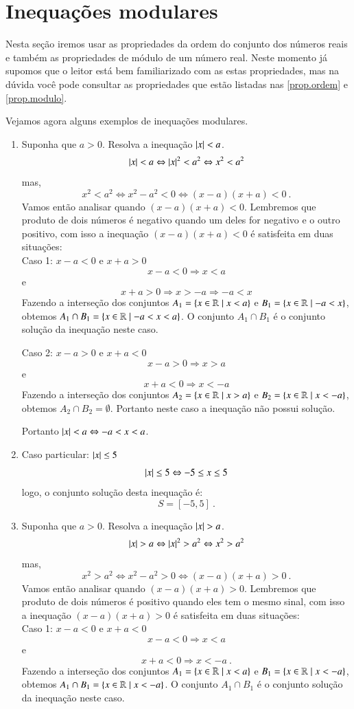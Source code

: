  \section{Inequações modulares}%

 Nesta seção iremos usar as propriedades da ordem do conjunto dos números reais e também as propriedades de módulo de um número real. Neste momento já supomos que o leitor está bem familiarizado com as estas propriedades, mas na dúvida você pode consultar as propriedades que estão listadas nas \autoref{prop.ordem} e \autoref{prop.modulo}.

 \begin{exem} Vejamos agora alguns exemplos de inequações modulares.
  \begin{enumerate}
   \item Suponha que $a> 0$. Resolva a inequação $\left|x\right| < a$.
   \[\left|x\right| < a \Leftrightarrow \left|x\right|^2 < a^2 \Leftrightarrow x^2 < a^2\]
   mas,
   \[x^2 < a^2 \Leftrightarrow x^2 - a^2 < 0 \Leftrightarrow (x-a)(x+a) < 0 \ .\]
   Vamos então analisar quando $(x-a)(x+a) < 0$. Lembremos que produto de dois números é negativo quando um deles for negativo e o outro positivo, com isso a inequação $(x-a)(x+a) < 0$ é satisfeita em duas situações:\\
   Caso 1: $x-a<0$ e $x+a>0$
   \[x-a<0 \Rightarrow x< a\]
   e
   \[x+a>0 \Rightarrow x>-a \Rightarrow -a< x\]
  Fazendo a interseção dos conjuntos $A_1= \left\{ x \in \mathbb{R} \mid x<a \right\}$ e $B_1= \left\{ x \in \mathbb{R} \mid -a<x \right\}$, obtemos $A_1 \cap B_1= \left\{ x \in \mathbb{R} \mid -a< x <a \right\}$. O conjunto $A_1 \cap B_1$ é o conjunto solução da inequação neste caso.


   Caso 2: $x-a>0$ e $x+a<0$
   \[x-a> 0 \Rightarrow x> a\]
   e
   \[x+a< 0 \Rightarrow x<-a\]
   Fazendo a interseção dos conjuntos $A_2= \left\{ x \in \mathbb{R} \mid x> a \right\}$ e $B_2= \left\{ x \in \mathbb{R} \mid x<-a \right\}$, obtemos $A_2 \cap B_2= \emptyset$. Portanto neste caso a inequação não possui solução.

  Portanto $\left|x\right| < a \Leftrightarrow -a< x <a$.

   \item Caso particular: $\left|x\right| \leq 5$
   \[\left|x\right| \leq 5 \Leftrightarrow -5 \leq x \leq 5\]
   logo, o conjunto solução desta inequação é:
   \[S= [-5, 5] \ . \]

   \item Suponha que $a> 0$. Resolva a inequação $\left|x\right| > a$.
   \[\left|x\right| > a \Leftrightarrow \left|x\right|^2 > a^2 \Leftrightarrow x^2 > a^2\]
   mas,
   \[x^2 > a^2 \Leftrightarrow x^2 - a^2 > 0 \Leftrightarrow (x-a)(x+a) > 0 \ .\]
   Vamos então analisar quando $(x-a)(x+a) > 0$. Lembremos que produto de dois números é positivo quando eles tem o mesmo sinal, com isso a inequação $(x-a)(x+a) > 0$ é satisfeita em duas situações:\\
   Caso 1: $x-a< 0$ e $x+a< 0$
   \[x-a< 0 \Rightarrow x< a\]
   e
   \[x+a< 0 \Rightarrow x< -a \ .\]
  Fazendo a interseção dos conjuntos $A_1= \left\{ x \in \mathbb{R} \mid x<a \right\}$ e $B_1= \left\{ x \in \mathbb{R} \mid x< -a \right\}$, obtemos $A_1 \cap B_1= \left\{ x \in \mathbb{R} \mid x< -a \right\}$. O conjunto $A_1 \cap B_1$ é o conjunto solução da inequação neste caso.



\end{enumerate}
\end{exem}
